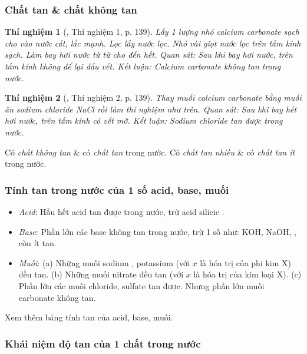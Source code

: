 \documentclass{article}
\newtheorem{thinghiem}{Thí nghiệm}
\begin{document}
\subsubsection{Chất tan \& chất không tan}

\begin{thinghiem}[\cite{SGK_Hoa_Hoc_8}, Thí nghiệm 1, p. 139]
	Lấy 1 lượng nhỏ calcium carbonate sạch \emph{} cho vào nước cất, lắc mạnh. Lọc lấy nước lọc. Nhỏ vài giọt nước lọc trên tấm kính sạch. Làm bay hơi nước từ từ cho đến hết. \emph{Quan sát:} Sau khi bay hơi nước, trên tấm kính không để lại dấu vết. \emph{Kết luận:} Calcium carbonate không tan trong nước.
\end{thinghiem}

\begin{thinghiem}[\cite{SGK_Hoa_Hoc_8}, Thí nghiệm 2, p. 139]
	Thay muối calcium carbonate bằng muối ăn sodium chloride \emph{NaCl} rồi làm thí nghiệm như trên. \emph{Quan sát:} Sau khi bay hết hơi nước, trên tấm kính có vết mờ. \emph{Kết luận:} Sodium chloride tan được trong nước.
\end{thinghiem}
Có \textit{chất không tan} \& có \textit{chất tan} trong nước. Có \textit{chất tan nhiều} \& có \textit{chất tan ít} trong nước.

\subsubsection{Tính tan trong nước của 1 số acid, base, muối}
\begin{itemize}
	\item \textit{Acid}: Hầu hết acid tan được trong nước, trừ acid silicic .
	\item \textit{Base}: Phần lớn các base không tan trong nước, trừ 1 số như: KOH, NaOH, , còn  ít tan.
	\item \textit{Muối}: (a) Những muối sodium , potassium  (với $x$ là hóa trị của phi kim X) đều tan. (b) Những muối nitrate  đều tan (với $x$ là hóa trị của kim loại X). (c) Phần lớn các muối chloride, sulfate tan được. Nhưng phần lớn muối carbonate không tan. 
\end{itemize}
Xem thêm bảng tính tan của acid, base, muối.

\subsubsection{Khái niệm độ tan của 1 chất trong nước}
\end{document}
